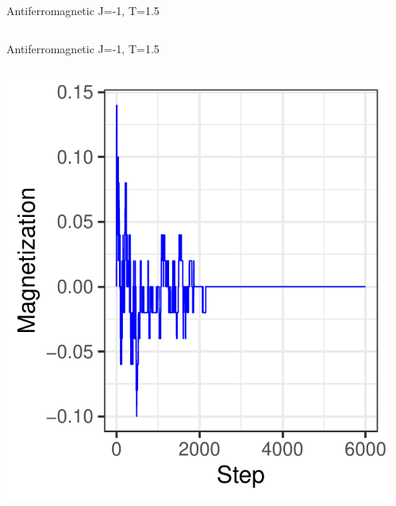 \documentclass{beamer}
\begin{document}
\begin{frame}{Antiferromagnetic J=-1, T=1.5}
\begin{columns}
\begin{column}{0.5\textwidth}
\begin{center}
     \end{center}
\end{column}
\end{columns}
\end{frame}

\begin{frame}{Antiferromagnetic J=-1, T=1.5}
\begin{columns}
\begin{column}{0.5\textwidth}
    \begin{center}
     \includegraphics[width=\textwidth]{Pic/J-1_60_2500_T=1.5_Magnetization.pdf}
     \end{center}
\end{column}
\begin{column}{0.5\textwidth}
    \begin{center}

\end{center}
\end{column}
\end{columns}
\end{frame}
\end{document}
